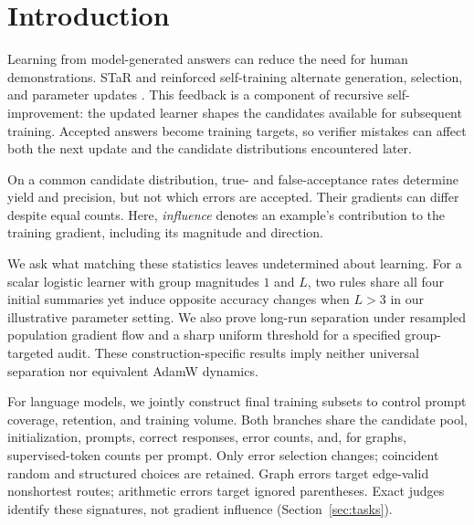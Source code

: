 \section{Introduction}
\label{sec:introduction}

Learning from model-generated answers can reduce the need for human
demonstrations. STaR and reinforced self-training alternate generation,
selection, and parameter updates \citep{zelikman2022star,singh2023restem}.
This feedback is a component of recursive self-improvement: the updated
learner shapes the candidates available for subsequent training.
Accepted answers become training targets, so verifier mistakes can affect
both the next update and the candidate distributions encountered later.

On a common candidate distribution, true- and false-acceptance rates determine
yield and precision, but not which errors are accepted. Their gradients can
differ despite equal counts. Here, \emph{influence} denotes an example's
contribution to the training gradient, including its magnitude and direction.

We ask what matching these statistics leaves undetermined about learning.
For a scalar logistic learner with group magnitudes $1$ and $L$, two rules
share all four initial summaries yet induce opposite accuracy changes when
$L>3$ in our illustrative parameter setting. We also prove long-run
separation under resampled population gradient flow and a sharp uniform
threshold for a specified group-targeted audit. These construction-specific
results imply neither universal separation nor equivalent AdamW dynamics.

For language models, we jointly construct final training subsets to control
prompt coverage, retention, and training volume. Both branches share the
candidate pool, initialization, prompts, correct responses, error counts,
and, for graphs, supervised-token counts per prompt. Only error selection
changes; coincident random and structured choices are retained. Graph errors
target edge-valid nonshortest routes; arithmetic errors target ignored
parentheses. Exact judges identify these signatures, not gradient influence
(Section~\ref{sec:tasks}).

